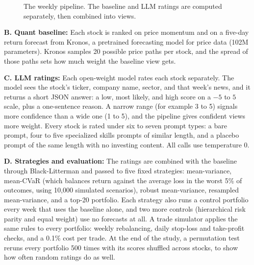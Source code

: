 \documentclass[11pt,letterpaper]{article}
\begin{document}
\begin{figure}[!t]\centering
{}
\caption{The weekly pipeline. The baseline and LLM ratings are computed separately, then combined into views.}
\end{figure}

\textbf{B. Quant baseline:} Each stock is ranked on price momentum and on a five-day return forecast from Kronos, a pretrained forecasting model for price data (102M parameters). Kronos samples 20 possible price paths per stock, and the spread of those paths sets how much weight the baseline view gets.

\textbf{C. LLM ratings:} Each open-weight model rates each stock separately. The model sees the stock's ticker, company name, sector, and that week's news, and it returns a short JSON answer: a low, most likely, and high score on a $-5$ to $5$ scale, plus a one-sentence reason. A narrow range (for example 3 to 5) signals more confidence than a wide one (1 to 5), and the pipeline gives confident views more weight. Every stock is rated under six to seven prompt types: a bare prompt, four to five specialized skills prompts of similar length, and a placebo prompt of the same length with no investing content. All calls use temperature 0.

\textbf{D. Strategies and evaluation:} The ratings are combined with the baseline through Black-Litterman and passed to five fixed strategies: mean-variance, mean-CVaR (which balances return against the average loss in the worst 5\% of outcomes, using 10,000 simulated scenarios), robust mean-variance, resampled mean-variance, and a top-20 portfolio. Each strategy also runs a control portfolio every week that uses the baseline alone, and two more controls (hierarchical risk parity and equal weight) use no forecasts at all. A trade simulator applies the same rules to every portfolio: weekly rebalancing, daily stop-loss and take-profit checks, and a 0.1\% cost per trade. At the end of the study, a permutation test reruns every portfolio 500 times with its scores shuffled across stocks, to show how often random ratings do as well.
\end{document}
